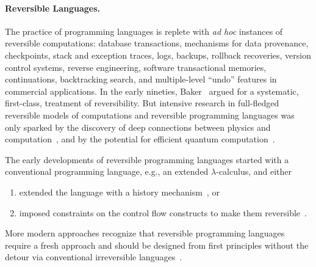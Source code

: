 \documentclass{entcs}
\begin{document}
\paragraph*{Reversible Languages.}
\noindent The practice of programming languages is replete with \emph{ad hoc}
instances of reversible computations: database transactions, mechanisms for data
provenance, checkpoints, stack and exception traces, logs, backups, rollback
recoveries, version control systems, reverse engineering, software transactional
memories, continuations, backtracking search, and multiple-level ``undo''
features in commercial applications. In the early nineties,
Baker~\cite{Baker:1992:LLL,Baker:1992:NFT} argued for a systematic, first-class,
treatment of reversibility. But intensive research in full-fledged reversible
models of computations and reversible programming languages was only sparked by
the discovery of deep connections between physics and
computation~\cite{Landauer:1961,PhysRevA.32.3266,Toffoli:1980,bennett1985fundamental,Frank:1999:REC:930275},
and by the potential for efficient quantum
computation~\cite{springerlink:10.1007/BF02650179}.

The early developments of reversible programming languages started with a
conventional programming language, e.g., an extended $\lambda$-calculus, and either
\begin{enumerate}
\item extended the language with a history
mechanism~\cite{vanTonder:2004,Kluge:1999:SEMCD,lorenz,danos2004reversible}, or
\item imposed constraints on the control flow constructs to make them
reversible~\cite{Yokoyama:2007:RPL:1244381.1244404}.
\end{enumerate}
More modern approaches recognize that reversible programming languages require
a fresh approach and should be designed from first principles without the
detour via conventional irreversible
languages~\cite{Yokoyama:2008:PRP,Mu:2004:ILRC,abramsky2005structural,DiPierro:2006:RCL:1166042.1166047}.
\end{document}

